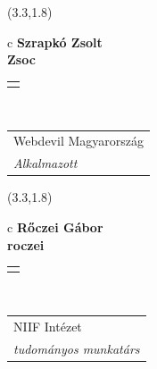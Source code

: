 \documentclass[11pt]{article}
\begin{document}
\makebox(3.3,1.8){
  \renewcommand\arraystretch{1.3}
  \begin{tabular}[c]{c}
    \hspace{8.5mm}
    \LARGE\bf{ Szrapkó Zsolt }\\
    \hspace{8.5mm}
    \Large{ Zsoc }\\
    \renewcommand\arraystretch{3}
    \begin{tabular}[c]{c}
      \centering
      \fontfamily{phv}\selectfont{
        \textbf{
          \textsc{
            \scriptsize{
            \color{Bright}{ Ismerkedő }\color{Bright}{ Webmester }\color{Bright}{ Sminkmester }\color{Bright}{ Programozó }
            }
          }
        }
      }
    \end{tabular}
    \\
    \renewcommand\arraystretch{1}
    \begin{tabular}{p{3.3in}}
      \hspace{.7cm}Webdevil Magyarország\\
      \hspace{.7cm}\emph{ Alkalmazott }\\
    \end{tabular}
  \end{tabular}
}

\makebox(3.3,1.8){
  \renewcommand\arraystretch{1.3}
  \begin{tabular}[c]{c}
    \hspace{8.5mm}
    \LARGE\bf{ Rőczei Gábor }\\
    \hspace{8.5mm}
    \Large{ roczei }\\
    \renewcommand\arraystretch{3}
    \begin{tabular}[c]{c}
      \centering
      \fontfamily{phv}\selectfont{
        \textbf{
          \textsc{
            \scriptsize{
            \color{Dark}{ Ismerkedő }\color{Dark}{ Webmester }\color{Bright}{ Sminkmester }\color{Dark}{ Programozó }
            }
          }
        }
      }
    \end{tabular}
    \\
    \renewcommand\arraystretch{1}
    \begin{tabular}{p{3.3in}}
      \hspace{.7cm}NIIF Intézet\\
      \hspace{.7cm}\emph{ tudományos munkatárs }\\
    \end{tabular}
  \end{tabular}
}
\end{document}
